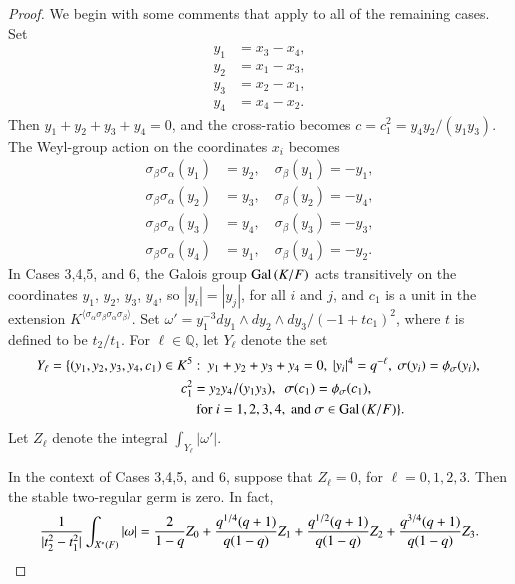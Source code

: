 \documentclass{amsart}
\newcommand\Q{{\mathbb Q}}
\newcommand\Gal{\hbox{Gal\,}}
\newenvironment{cthm}[1]
  {\renewcommand\thethm{\sc #1}\thm}
  {\endthm}
\begin{document}
\begin{proof}
We begin with some comments that apply to all of the
remaining cases.
Set
\begin{align*}
y_1 &= x_3 - x_4,\\
y_2 &= x_1 - x_3, \\
y_3 &= x_2 - x_1,\\
y_4 &= x_4 - x_2.
\end{align*}
Then $y_1+y_2+y_3+y_4=0$, and the cross-ratio becomes
$c=c_1^2 = y_4 y_2/(y_1 y_3)$.  The Weyl-group action on the
coordinates $x_i$ becomes
\begin{equation}
\begin{aligned}
\sigma_\beta\sigma_\alpha(y_1) &= y_2,\quad \sigma_\beta(y_1) = -y_1,\\
\sigma_\beta\sigma_\alpha(y_2) &= y_3,\quad \sigma_\beta(y_2) = -y_4,\\
\sigma_\beta\sigma_\alpha(y_3) &= y_4,\quad \sigma_\beta(y_3) = -y_3,\\
\sigma_\beta\sigma_\alpha(y_4) &= y_1,\quad \sigma_\beta(y_4) = -y_2.
\end{aligned}\tag{3.5}
\end{equation}
In Cases 3,4,5, and 6, the Galois group $\Gal(K/F)$ acts transitively
on the coordinates $y_1$, $y_2$, $y_3$, $y_4$, so
$|y_i|=|y_j|$, for all $i$ and $j$, and $c_1$ is a unit in the
extension 
$K^{\langle\sigma_\alpha\sigma_\beta\sigma_\alpha\sigma_\beta\rangle}$.
Set 
$\omega' = y_1^{-3}dy_1\wedge dy_2\wedge dy_3/(-1 + t c_1)^2$,
where $t$ is defined to be $t_2/t_1$.  
For $\ell\in\Q$, let $Y_\ell$ 
denote the set
\begin{align*}
Y_\ell= \{(y_1,y_2,y_3,y_4,c_1)\in K^5&: \ y_1+y_2+y_3+y_4=0,\ 
 |y_i|^4 = q^{-\ell},\ \sigma(y_i)=\phi_\sigma(y_i),\ \\
 c_1^2 &= y_2 y_4/(y_1 y_3),\ \ 
 \sigma(c_1) = \phi_\sigma(c_1),\\
   &\text{ for }
 i=1,2,3,4,\text{ and } \sigma\in\Gal(K/F)\}.
\end{align*}
Let $Z_\ell$ denote the integral $\int_{Y_\ell} |\omega'|$.

\bigskip
\noindent
\begin{cthm}{Lemma 3.6}   In the context of Cases 3,4,5, and 6, suppose that
$Z_\ell=0$,
for $\ell=0,1,2,3$.  Then the stable
two-regular germ is zero.
In fact,
$$
{1\over |t_2^2-t_1^2|} \int_{X^*(F)}|\omega| =
{2\over 1-q} Z_0 + {q^{1/4} (q+1)\over q (1-q)} Z_1 +
{q^{1/2} (q+1)\over q (1-q)} Z_2 + {q^{3/4} (q+1)\over q (1-q)}
Z_3.$$
\end{cthm}
\bigskip


\end{proof}
\end{document}
